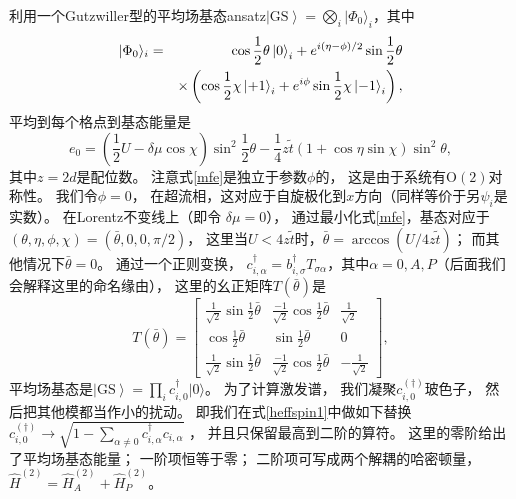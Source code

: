 利用一个Gutzwiller型的平均场基态ansatz$\left| \text{GS} \right\rangle = \bigotimes_i | \Phi_0 \rangle_i$，其中
\begin{eqnarray}
      | \Phi_0 \rangle_i &=& \cos \frac{1}{2}\theta \ket{0}_i + e^{i (\eta-\phi) / 2} \sin \frac{1}{2}\theta \nonumber\\
      &&  \times \left( \cos \frac{1}{2}\chi \ket{+1}_i + e^{i \phi } \sin \frac{1}{2}\chi \ket{-1}_i   \right),\nonumber
\end{eqnarray}
平均到每个格点到基态能量是
\begin{equation}
  e_0 = \left( \frac{1}{2}U - \delta \mu \cos \chi \right) \sin^2  \frac{1}{2}\theta - \frac{1}{4} z\tilde{t} (1 + \cos \eta \sin  \chi) \sin^2 \theta , \label{mfe}
\end{equation}
其中$z=2d$是配位数。
注意式\eqref{mfe}是独立于参数$\phi$的，
这是由于系统有$\mathrm{O} (2)$对称性。
我们令$\phi=0$，
在超流相，这对应于自旋极化到$x$方向（同样等价于另$\psi_i$是实数）。
在Lorentz不变线上（即令 $\delta \mu = 0$），
通过最小化式\eqref{mfe}，基态对应于$(\theta, \eta, \phi, \chi) = (\bar{\theta}, 0, 0, \pi / 2)$，
这里当$U < 4z \tilde{t}$时，$\bar{\theta} = \arccos (U / 4z \tilde{t})$；
而其他情况下$\bar{\theta} = 0$。
通过一个正则变换，
$c_{i, \alpha}^{ \dagger} = b_{i, \sigma}^{ \dagger} T_{\sigma \alpha}$，其中$\alpha = 0, A, P$（后面我们会解释这里的命名缘由），
这里的幺正矩阵$T(\bar\theta)$是
\begin{equation}
   T(\bar\theta) = \begin{bmatrix}
           \frac{1}{\sqrt{2}} \sin \frac{1}{2}\bar{\theta} & \frac{- 1}{\sqrt{2}}     \cos \frac{1}{2}\bar{\theta} & \frac{1}{\sqrt{2}}\\
     \cos \frac{1}{2}\bar{\theta} & \sin \frac{1}{2}\bar{\theta} & 0\\
     \frac{1}{\sqrt{2}} \sin \frac{1}{2}\bar{\theta} & \frac{- 1}{\sqrt{2}}     \cos \frac{1}{2}\bar{\theta} & - \frac{1}{\sqrt{2}}
  \end{bmatrix},\nonumber
\end{equation}
平均场基态是$\left| \text{GS} \right\rangle = \prod_i c_{i,0}^{ \dagger} |0 \rangle$。
为了计算激发谱，
我们凝聚$c_{i,0}^{(\dagger)}$玻色子，
然后把其他模都当作小的扰动。
即我们在式\eqref{heffspin1}中做如下替换$c_{i, 0}^{( \dagger)} \rightarrow \sqrt{1 - \sum_{\alpha \neq 0} c_{i, \alpha}^{ \dagger} c_{i, \alpha}}$ \cite{Auerbach1994}，
并且只保留最高到二阶的算符。
这里的零阶给出了平均场基态能量；
一阶项恒等于零；
二阶项可写成两个解耦的哈密顿量，
$\hat{H}^{(2)} = \hat{H}_{A}^{(2)} + \hat{H}_{P}^{(2)}$。
